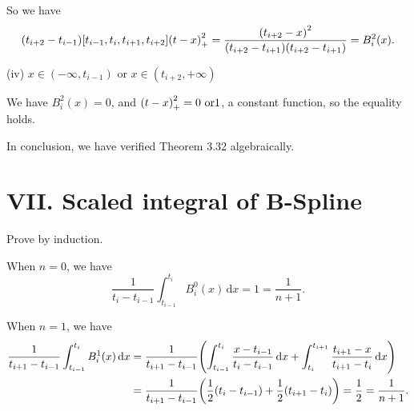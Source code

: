 \documentclass[a4paper]{article}
\begin{document}
So we have 
\begin{equation}
    \qty(t_{i+2}-t_{i-1}) [t_{i-1}, t_i, t_{i+1}, t_{i+2}] \qty(t-x)_{+}^2 = \frac{\qty(t_{i+2} - x)^2}{\qty(t_{i+2}-t_{i+1})\qty(t_{i+2}-t_{i+1})} = B_i^2(x).
\end{equation}

(iv) $x \in (-\infty, t_{i-1})$ or $x \in (t_{i+2}, +\infty)$

We have $B_i^2(x) = 0$, and $\qty(t-x)_{+}^2 = 0 ~\text{or} 1$, a constant function, so the equality holds.


In conclusion, we have verified Theorem 3.32 algebraically. 


\section*{VII. Scaled integral of B-Spline}

Prove by induction.

When $n=0$, we have
\begin{equation}
    \frac{1}{t_{i} - t_{i-1}} \int_{t_{i-1}}^{t_i} B_i^{0}(x) \,\mathrm{d}x = 1 = \frac{1}{n+1}. 
\end{equation}

When $n=1$, we have
\begin{equation}
    \begin{aligned}
        \frac{1}{t_{i+1} - t_{i-1}} \int_{t_{i-1}}^{t_i} B_i^{1}(x) \,\mathrm{d}x &= \frac{1}{t_{i+1} - t_{i-1}} \qty(\int_{t_{i-1}}^{t_i} \frac{x-t_{i-1}}{t_i - t_{i-1}} \,\mathrm{d}x + \int_{t_{i}}^{t_{i+1}} \frac{t_{i+1} - x}{t_{i+1} - t_{i}} \,\mathrm{d}x) \\
        &= \frac{1}{t_{i+1} - t_{i-1}} \qty(\frac{1}{2} \qty(t_i - t_{i-1}) + \frac{1}{2} \qty(t_{i+1} - t_i)) = \frac{1}{2} = \frac{1}{n+1}.
    \end{aligned}
\end{equation}
\end{document}
